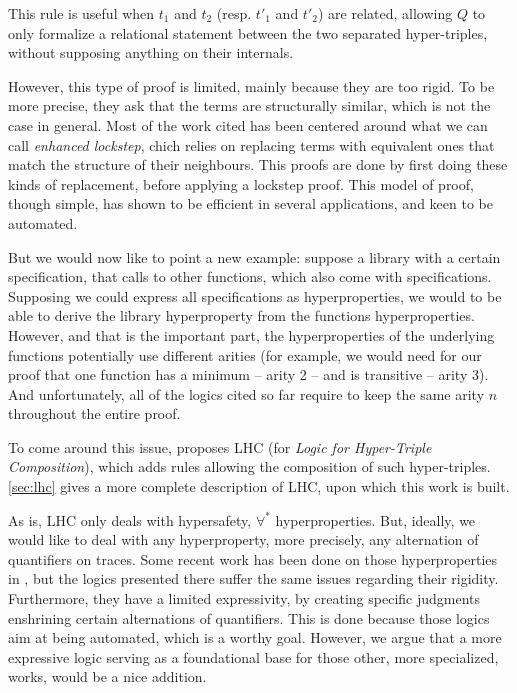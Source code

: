This rule is useful when $t_1$ and $t_2$ (resp. $t'_1$ and $t'_2$) are related, allowing $Q$ to only formalize a relational statement between the two separated hyper-triples, without supposing anything on their internals.

However, this type of proof is limited, mainly because they are too rigid. To be more precise, they ask that the terms are structurally similar, which is not the case in general. Most of the work cited has been centered around what we can call \emph{enhanced lockstep}, chich relies on replacing terms with equivalent ones that match the structure of their neighbours. This proofs are done by first doing these kinds of replacement, before applying a lockstep proof. This model of proof, though simple, has shown to be efficient in several applications, and keen to be automated.

But we would now like to point a new example: suppose a library with a certain specification, that calls to other functions, which also come with specifications. Supposing we could express all specifications as hyperproperties, we would to be able to derive the library hyperproperty from the functions hyperproperties. However, and that is the important part, the hyperproperties of the underlying functions potentially use different arities (for example, we would need for our proof that one function has a minimum -- arity 2 -- and is transitive -- arity 3). And unfortunately, all of the logics cited so far require to keep the same arity $n$ throughout the entire proof.

To come around this issue, \citet{DOsualdo22} proposes LHC (for \emph{Logic for Hyper-Triple Composition}), which adds rules allowing the composition of such hyper-triples. \cref{sec:lhc} gives a more complete description of LHC, upon which this work is built.

As is, LHC only deals with hypersafety, \ie $\forall^*$ hyperproperties. But, ideally, we would like to deal with any hyperproperty, more precisely, any alternation of quantifiers on traces. Some recent work has been done on those hyperproperties in \cite{Dickerson22, Dardinier23, Beutner22}, but the logics presented there suffer the same issues regarding their rigidity. Furthermore, they have a limited expressivity, by creating specific judgments enshrining certain alternations of quantifiers. This is done because those logics aim at being automated, which is a worthy goal. However, we argue that a more expressive logic serving as a foundational base for those other, more specialized, works, would be a nice addition.

